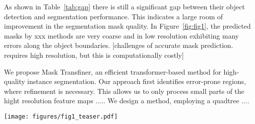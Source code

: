 \documentclass[10pt,twocolumn,letterpaper]{article}
\begin{document}
As shown in Table~\ref{tab:gap} there is still a significant gap between their object detection and segmentation performance. This indicates a large room of improvement in the segmentation mask quality. In Figure~\ref{fig:fig1}, the predicted masks by xxx methods are very coarse and in low resolution exhibiting many errors along the object boundaries. [challenges of accurate mask prediction. requires high resolution, but this is computationally costly] 



We propose Mask Transfiner, an efficient transformer-based method for high-quality instance segmentation. Our approach first identifies error-prone regions, where refinement is necessary. This allows us to only process small parts of the hight resolution feature maps .....
We design a method, employing a quadtree ....
















\begin{figure*}[!t]
	\centering
\texttt{[image: figures/fig1\_teaser.pdf]}
	\vspace{-0.15in}
	\caption{Instance Segmentation on \textbf{COCO}~\cite{lin2014microsoft} validation set by a) Mask R-CNN~\cite{he2017mask}, b) BMask R-CNN~\cite{liu2018path}, c) SOLQ~\cite{huang2019mask}, d) PointRend~\cite{kirillov2020pointrend}, g) Mask Transfiner (Ours) using R50-FPN as backbone. }
\label{fig:fig1}
    \vspace{-0.1in}
\end{figure*}
\end{document}
